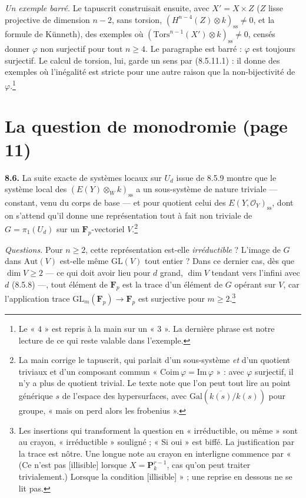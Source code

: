 \documentclass[11pt,a4paper]{article}
\begin{document}
\emph{Un exemple barré.} Le tapuscrit construisait ensuite, avec
$X' = X \times Z$ ($Z$ lisse projective de dimension $n - 2$, sans torsion,
$(H^{n-4}(Z) \otimes k)_{\mathrm{ss}} \neq 0$, et la formule de Künneth),
des exemples où $(\mathrm{Tors}^{n-1}(X') \otimes k)_{\mathrm{ss}} \neq 0$,
censés donner $\varphi$ non surjectif pour tout $n \geq 4$. Le paragraphe est
barré : $\varphi$ est toujours surjectif. Le calcul de torsion, lui, garde un
sens par (8.5.11.1) : il donne des exemples où l'inégalité est stricte pour
une autre raison que la non-bijectivité de $\varphi$.\footnote{Le « $4$ » est
repris à la main sur un « $3$ ». La dernière phrase est notre lecture de ce
qui reste valable dans l'exemple.}

\section*{La question de monodromie (page 11)}

\textbf{8.6.} La suite exacte de systèmes locaux sur $U_{d}$ issue de 8.5.9
montre que le système local des $(E(Y) \otimes_{W} k)_{\mathrm{ss}}$ a un
sous-système de nature triviale --- constant, venu du corps de base --- et
pour quotient celui des $E(Y, \mathcal{O}_{Y})_{\mathrm{ss}}$, dont on
s'attend qu'il donne une représentation tout à fait non triviale de $G =
\pi_{1}(U_{d})$ sur un $\mathbf{F}_{p}$-vectoriel $V$.\footnote{La main
corrige le tapuscrit, qui parlait d'un sous-système \emph{et} d'un quotient
triviaux et d'un composant commun « $\mathrm{Coim}\, \varphi =
\mathrm{Im}\, \varphi$ » : avec $\varphi$ surjectif, il n'y a plus de
quotient trivial. Le texte note que l'on peut tout lire au point générique
$s$ de l'espace des hypersurfaces, avec $\mathrm{Gal}(\overline{k(s)}/k(s))$
pour groupe, « mais on perd alors les frobenius ».}

\emph{Questions.} Pour $n \geq 2$, cette représentation est-elle
\emph{irréductible} ? L'image de $G$ dans $\mathrm{Aut}(V)$ est-elle même
$\mathrm{GL}(V)$ tout entier ? Dans ce dernier cas, dès que $\dim V \geq 2$
--- ce qui doit avoir lieu pour $d$ grand, $\dim V$ tendant vers l'infini
avec $d$ (8.5.8) ---, tout élément de $\mathbf{F}_{p}$ est la trace d'un
élément de $G$ opérant sur $V$, car l'application trace
$\mathrm{GL}_{m}(\mathbf{F}_{p}) \to \mathbf{F}_{p}$ est surjective pour
$m \geq 2$.\footnote{Les insertions qui transforment la question en
« irréductible, ou même » sont au crayon, « irréductible » souligné ; « Si
oui » est biffé. La justification par la trace est nôtre. Une longue note au
crayon en interligne commence par « (Ce n'est pas [illisible] lorsque
$X = \mathbf{P}^{r-1}_{k}$, cas qu'on peut traiter trivialement.) Lorsque la
condition [illisible] » ; une reprise en dessous ne se lit pas.}
\end{document}
